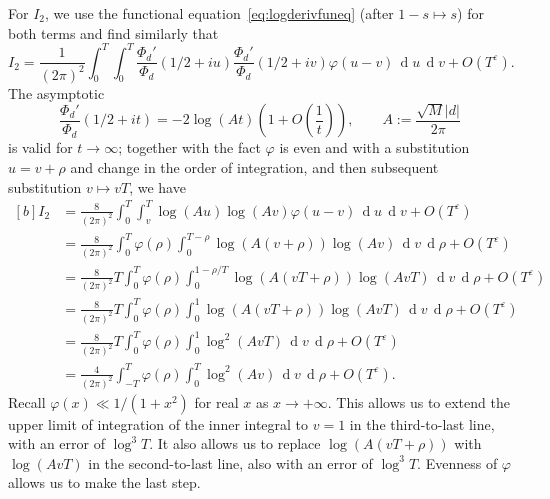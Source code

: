 \documentclass[11pt,reqno]{amsart} \usepackage{fullpage}
\newcommand{\vep}{\varepsilon}
\newcommand{\ra}{\rightarrow}
\renewcommand{\d}[1]{\,\operatorname*{d}\!{#1}}
\newcommand\be{\begin{equation}}
\newcommand\ee{\end{equation}}
\newcommand{\gf}{\Phi_d}
\numberwithin{equation}{section}
\begin{document}
For $I_2$, we use the functional equation~\eqref{eq:logderivfuneq} (after $1-s\mapsto s$)
for both terms and find similarly that
\be I_2=\frac1{(2\pi)^2}\int_0^T\int_0^T\frac{\gf'}{\gf}(1/2+iu)
\frac{\gf'}{\gf}(1/2+iv)\varphi(u-v)\d u\d v+O(T^\vep).\ee
The asymptotic \be\frac{\gf'}{\gf}(1/2+it)=-2\log\left(A t\right)
\left(1+O\left(\frac 1t\right)\right),\qquad A:=\frac{\sqrt M |d|}{2\pi}\ee is valid for
$t\ra\infty$; together with the fact $\varphi$ is even and with a substitution $u=v+\rho$
and change in the order of integration, and then subsequent substitution $v\mapsto vT$, we
have
\be\label{eq:I2}\begin{aligned}[b]
  I_2&=\frac8{(2\pi)^2}\int_0^T\int_v^T\log(Au)\log(Av)\varphi(u-v)\d u\d v+O(T^\vep) \\
  &=\frac8{(2\pi)^2}\int_0^T\varphi(\rho)\int_0^{T-\rho}\log(A(v+\rho))\log(Av)\d v\d\rho
  +O(T^\vep) \\
  &=\frac8{(2\pi)^2}T\int_0^T\varphi(\rho)\int_0^{1-\rho/T}\log(A(vT+\rho))\log(AvT)
  \d v\d\rho+O(T^\vep) \\
  &=\frac8{(2\pi)^2}T\int_0^T\varphi(\rho)\int_0^1\log(A(vT+\rho))\log(AvT)
  \d v\d\rho+O(T^\vep) \\
  &=\frac8{(2\pi)^2}T\int_0^T\varphi(\rho)\int_0^1\log^2(AvT)\d v\d\rho+O(T^\vep) \\
  &=\frac4{(2\pi)^2}\int_{-T}^T\varphi(\rho)\int_0^T\log^2(Av)\d v\d\rho+O(T^\vep).
\end{aligned}\ee
Recall $\varphi(x)\ll1/(1+x^2)$ for real $x$ as $x\ra+\infty$.
This allows us to extend the upper limit of integration of the inner integral to $v=1$ in
the third-to-last line, with an error of $\log^3 T$. It also allows us to replace
$\log(A(vT+\rho))$ with $\log(AvT)$ in the second-to-last line, also with an error of
$\log^3 T$. Evenness of $\varphi$ allows us to make the last step.
\end{document}
